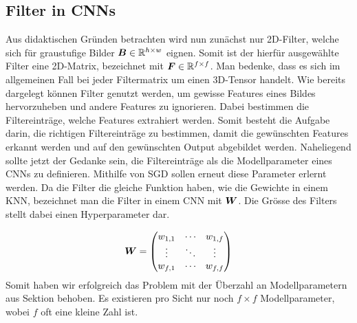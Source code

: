 \subsection{Filter in CNNs}
Aus didaktischen Gründen betrachten wird nun zunächst
nur 2D-Filter, welche sich für graustufige Bilder
$\bm{B} \in \mathbb{R}^{h \times w}$ eignen. Somit ist der hierfür ausgewählte
Filter eine 2D-Matrix, bezeichnet mit $\bm{F} \in \mathbb{R}^{f \times
  f}$. Man bedenke, dass es sich im allgemeinen Fall bei jeder Filtermatrix
um einen 3D-Tensor handelt.
\para{}
Wie bereits dargelegt können Filter genutzt werden, um gewisse
Features eines Bildes hervorzuheben und andere Features zu ignorieren. Dabei
bestimmen die Filtereinträge, welche Features extrahiert werden. Somit besteht
die Aufgabe darin, die richtigen Filtereinträge zu bestimmen, damit die
gewünschten Features erkannt werden und auf den gewünschten Output abgebildet
werden. Naheliegend sollte jetzt der Gedanke sein, die Filtereinträge als die
Modellparameter eines CNNs zu definieren.
Mithilfe von SGD sollen erneut diese Parameter
erlernt werden.
\para{}
Da die Filter die gleiche Funktion haben, wie die Gewichte in einem KNN,
bezeichnet man die Filter in einem CNN mit $\bm{W}$. Die Grösse des Filters
stellt dabei einen Hyperparameter dar.

\begin{equation*}
  \bm{W} = \begin{pmatrix}
    w_{1,1} & \cdots & w_{1,f} \\
    \vdots & \ddots & \vdots \\
    w_{f,1} & \cdots & w_{f,f}
  \end{pmatrix}
\end{equation*}
Somit haben wir erfolgreich das Problem mit der Überzahl an Modellparametern aus
Sektion  behoben. Es existieren pro Sicht nur noch $f \times f$
Modellparameter, wobei $f$ oft eine kleine Zahl ist.


